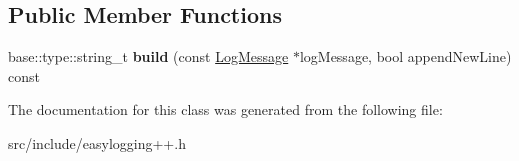 \subsection*{Public Member Functions}
\begin{DoxyCompactItemize}
\item 
\mbox{\label{classel_1_1base_1_1_default_log_builder_a9ee7983bc51f1fac887806e909ecbbbd}} 
base\+::type\+::string\+\_\+t {\bfseries build} (const \hyperlink{classel_1_1_log_message}{Log\+Message} $\ast$log\+Message, bool append\+New\+Line) const
\end{DoxyCompactItemize}


The documentation for this class was generated from the following file\+:\begin{DoxyCompactItemize}
\item 
src/include/easylogging++.\+h\end{DoxyCompactItemize}
